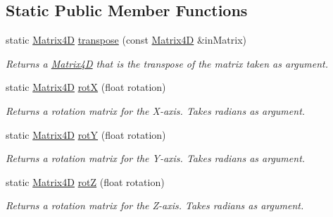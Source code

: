 \subsection*{Static Public Member Functions}
\begin{DoxyCompactItemize}
\item 
\mbox{\label{class_matrix4_d_aac3e6a51022935fc8868d6e514a5c417}} 
static \mbox{\hyperlink{class_matrix4_d}{Matrix4D}} \mbox{\hyperlink{class_matrix4_d_aac3e6a51022935fc8868d6e514a5c417}{transpose}} (const \mbox{\hyperlink{class_matrix4_d}{Matrix4D}} \&in\+Matrix)
\begin{DoxyCompactList}\small\item\em Returns a \mbox{\hyperlink{class_matrix4_d}{Matrix4D}} that is the transpose of the matrix taken as argument. \end{DoxyCompactList}\item 
\mbox{\label{class_matrix4_d_aaba84264f00b2a3b9038236e33ce85e2}} 
static \mbox{\hyperlink{class_matrix4_d}{Matrix4D}} \mbox{\hyperlink{class_matrix4_d_aaba84264f00b2a3b9038236e33ce85e2}{rotX}} (float rotation)
\begin{DoxyCompactList}\small\item\em Returns a rotation matrix for the X-\/axis. Takes radians as argument. \end{DoxyCompactList}\item 
\mbox{\label{class_matrix4_d_a3deb6b9668b403b31d1759be4722b6b5}} 
static \mbox{\hyperlink{class_matrix4_d}{Matrix4D}} \mbox{\hyperlink{class_matrix4_d_a3deb6b9668b403b31d1759be4722b6b5}{rotY}} (float rotation)
\begin{DoxyCompactList}\small\item\em Returns a rotation matrix for the Y-\/axis. Takes radians as argument. \end{DoxyCompactList}\item 
\mbox{\label{class_matrix4_d_a011faf931ce11c65b4c7f222de1db1b1}} 
static \mbox{\hyperlink{class_matrix4_d}{Matrix4D}} \mbox{\hyperlink{class_matrix4_d_a011faf931ce11c65b4c7f222de1db1b1}{rotZ}} (float rotation)
\begin{DoxyCompactList}\small\item\em Returns a rotation matrix for the Z-\/axis. Takes radians as argument. \end{DoxyCompactList}\item 

\end{DoxyCompactItemize}

